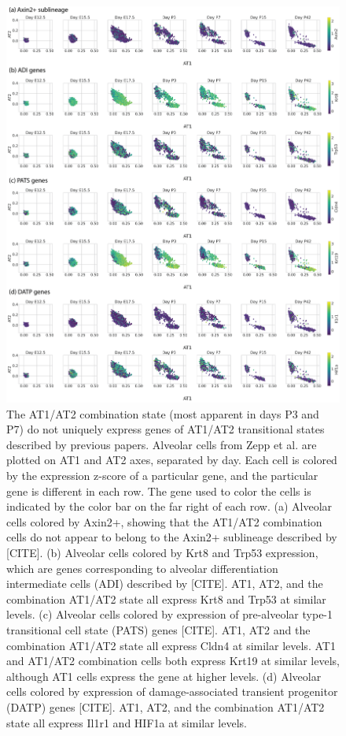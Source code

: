 \documentclass[aps,superscriptaddress, notitlepage,longbibliography]{revtex4-1}
\begin{document}
\begin{figure}
	\centering
		\includegraphics[scale=0.8]{figs/LungMAP genes.png}
	\caption{The AT1/AT2 combination state (most apparent in days P3 and P7) do not uniquely express genes of AT1/AT2 transitional states described by previous papers. Alveolar cells from Zepp et al. are plotted on AT1 and AT2 axes, separated by day. Each cell is colored by the expression z-score of a particular gene, and the particular gene is different in each row. The gene used to color the cells is indicated by the color bar on the far right of each row. (a) Alveolar cells colored by Axin2+, showing that the AT1/AT2 combination cells do not appear to belong to the Axin2+ sublineage described by [CITE]. (b) Alveolar cells colored by Krt8 and Trp53 expression, which are genes corresponding to alveolar differentiation intermediate cells (ADI) described by [CITE]. AT1, AT2, and the combination AT1/AT2 state all express Krt8 and Trp53 at similar levels. (c) Alveolar cells colored by expression of pre-alveolar type-1 transitional cell state (PATS) genes [CITE]. AT1, AT2 and the combination AT1/AT2 state all express Cldn4 at similar levels. AT1 and AT1/AT2 combination cells both express Krt19 at similar levels, although AT1 cells express the gene at higher levels. (d) Alveolar cells colored by expression of damage-associated transient progenitor (DATP) genes [CITE]. AT1, AT2, and the combination AT1/AT2 state all express Il1r1 and HIF1a at similar levels. }
	\label{LungMAP genes}
\end{figure}
\end{document}
